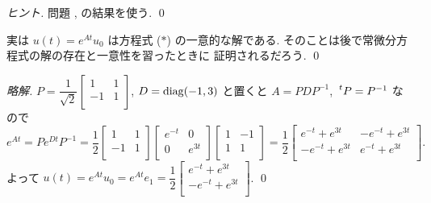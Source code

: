 \documentclass[12pt,twoside]{jarticle}
\newcommand\commentout[1]{#1}
\newcommand\commentout[1]{}
\begin{document}
\begin{proof}[ヒント]
  問題 ,  の結果を使う. \qed
\end{proof}

\begin{guide}
  実は $u(t)=e^{At}u_0$ は方程式 ($*$) の一意的な解である. 
  そのことは後で常微分方程式の解の存在と一意性を習ったときに
  証明されるだろう.
  \qed
\end{guide}

\commentout{
\begin{proof}[略解]
  \quad \(
  P = \dfrac{1}{\sqrt{2}}
  \begin{bmatrix}
     1 & 1 \\
    -1 & 1 \\
  \end{bmatrix}
  \), \(
  D = \mathop{\mathrm{diag}}\nolimits(-1,3)
  \) と置くと $A = PDP^{-1}$, $\tp{P}=P^{-1}$ なので
  \begin{equation*}
    e^{At} = 
    Pe^{Dt}P^{-1} =
    \frac{1}{2}
    \begin{bmatrix}
       1 & 1 \\
      -1 & 1 \\
    \end{bmatrix}
    \begin{bmatrix}
      e^{-t} & 0 \\
      0      & e^{3t} \\
    \end{bmatrix}
    \begin{bmatrix}
      1 & -1 \\
      1 &  1 \\
    \end{bmatrix}
    = \frac{1}{2}
    \begin{bmatrix}
       e^{-t} + e^{3t} & -e^{-t} + e^{3t} \\
      -e^{-t} + e^{3t} &  e^{-t} + e^{3t} \\
    \end{bmatrix}.
  \end{equation*}
  よって \(
    u(t)=e^{At}u_0=e^{At}e_1
    =\dfrac{1}{2}
    \begin{bmatrix}
       e^{-t} + e^{3t} \\
      -e^{-t} + e^{3t} \\
    \end{bmatrix}
  \). \qed
\end{proof}
}

\end{document}
